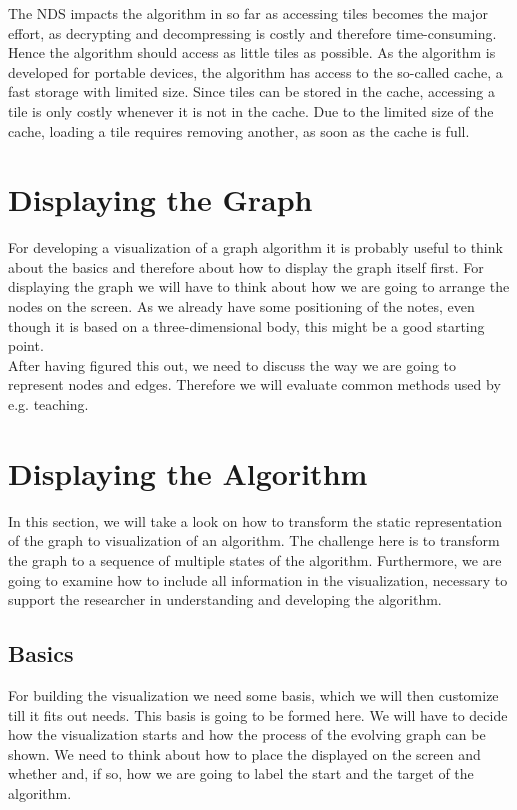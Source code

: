 \documentclass
[
	paper = a4,
    pagesize,
	12 pt,
	oneside,                       %
    open = right,
	DIV = calc,
	BCOR = 0 mm,                   %
	bibtotoc
]
{scrbook}
\begin{document}
\par The NDS impacts the algorithm in so far as accessing tiles becomes the major effort, as decrypting and decompressing is costly and therefore time-consuming.
Hence the algorithm should access as little tiles as possible.
As the algorithm is developed for portable devices, the algorithm has access to the so-called cache, a fast storage with limited size.
Since tiles can be stored in the cache, accessing a tile is only costly whenever it is not in the cache.
Due to the limited size of the cache, loading a tile requires removing another, as soon as the cache is full.



\section{Displaying the Graph} \label{graph}

For developing a visualization of a graph algorithm it is probably useful to think about the basics and therefore about how to display the graph itself first.
For displaying the graph we will have to think about how we are going to arrange the nodes on the screen.
As we already have some positioning of the notes, even though it is based on a three-dimensional body, this might be a good starting point.
\\After having figured this out, we need to discuss the way we are going to represent nodes and edges.
Therefore we will evaluate common methods used by e.g. teaching.


\section{Displaying the Algorithm}

In this section, we will take a look on how to transform the static representation of the graph to visualization of an algorithm.
The challenge here is to transform the graph to a sequence of multiple states of the algorithm.
Furthermore, we are going to examine how to include all information in the visualization, necessary to support the researcher in understanding and developing the algorithm.


\subsection{Basics}

For building the visualization we need some basis, which we will then customize till it fits out needs.
This basis is going to be formed here.
We will have to decide how the visualization starts and how the process of the evolving graph can be shown.
We need to think about how to place the displayed on the screen and whether and, if so, how we are going to label the start and the target of the algorithm.
\end{document}
